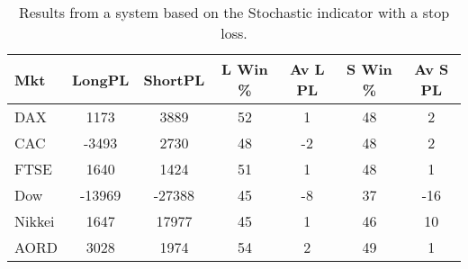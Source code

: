 \begin{table}[ht]
\centering
\caption[Results from a system based on the Stochastic indicator with a stop loss]{Results from a system based on the Stochastic indicator with a stop loss.} 
\label{tab:stoch_results_sloss}
\begin{tabular}{lcccccc}
  \toprule Mkt & LongPL & ShortPL & L Win \% & Av L PL & S Win \% & Av S PL \\ 
  \midrule DAX & 1173 & 3889 & 52 & 1 & 48 & 2 \\ 
  CAC & -3493 & 2730 & 48 & -2 & 48 & 2 \\ 
  FTSE & 1640 & 1424 & 51 & 1 & 48 & 1 \\ 
  Dow & -13969 & -27388 & 45 & -8 & 37 & -16 \\ 
  Nikkei & 1647 & 17977 & 45 & 1 & 46 & 10 \\ 
  AORD & 3028 & 1974 & 54 & 2 & 49 & 1 \\ 
   \bottomrule \end{tabular}
\end{table}
